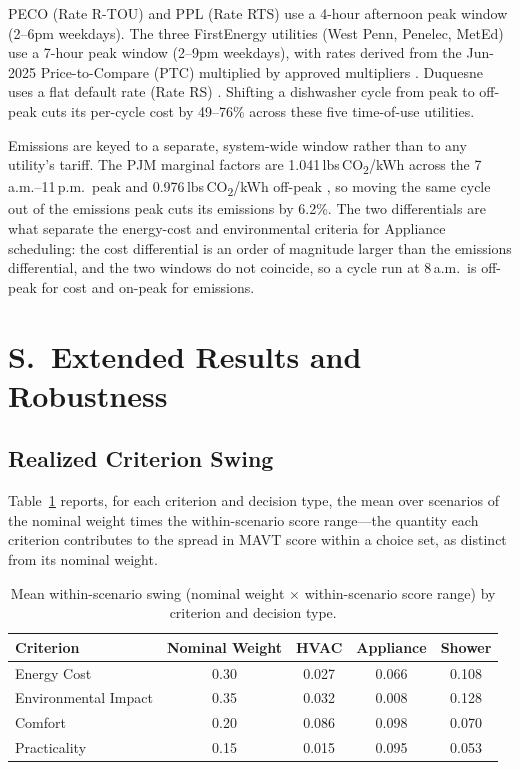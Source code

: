 \documentclass[11pt]{article}
\newcounter{suppsectioncounter}
\newcommand{\suppsection}[1]{%
  \stepcounter{suppsectioncounter}%
  \section*{S\thesuppsectioncounter.\ #1}%
  \setcounter{table}{0}\setcounter{figure}{0}\setcounter{equation}{0}%
  \renewcommand{\theHtable}{S\thesuppsectioncounter.\arabic{table}}%
  \renewcommand{\theHfigure}{S\thesuppsectioncounter.\arabic{figure}}%
}
\begin{document}
PECO (Rate R-TOU) \citep{peco2021} and PPL (Rate RTS) \citep{ppl2025} use a 4-hour afternoon peak window (2--6pm weekdays). The three FirstEnergy utilities (West Penn, Penelec, MetEd) use a 7-hour peak window (2--9pm weekdays), with rates derived from the Jun-2025 Price-to-Compare (PTC) multiplied by approved multipliers \citep{firstenergy2025,firstenergy2026}. Duquesne uses a flat default rate (Rate RS) \citep{duquesne2026}. Shifting a dishwasher cycle from peak to off-peak cuts its per-cycle cost by 49--76\% across these five time-of-use utilities.

Emissions are keyed to a separate, system-wide window rather than to any utility's tariff. The PJM marginal factors are 1.041\,lbs\,CO\textsubscript{2}/kWh across the 7\,a.m.--11\,p.m.\ peak and 0.976\,lbs\,CO\textsubscript{2}/kWh off-peak \citep{pjm2022emissions}, so moving the same cycle out of the emissions peak cuts its emissions by 6.2\%. The two differentials are what separate the energy-cost and environmental criteria for Appliance scheduling: the cost differential is an order of magnitude larger than the emissions differential, and the two windows do not coincide, so a cycle run at 8\,a.m.\ is off-peak for cost and on-peak for emissions.
\suppsection{Extended Results and Robustness}

\subsection{Realized Criterion Swing}
\label{app:swing_weights}

Table~\ref{tab:swing_weights} reports, for each criterion and decision type, the mean over scenarios of the nominal weight times the within-scenario score range---the quantity each criterion contributes to the spread in MAVT score within a choice set, as distinct from its nominal weight.

\begin{table}[htbp]
\centering
\footnotesize
\centering
\caption{Mean within-scenario swing (nominal weight $\times$ within-scenario score range) by criterion and decision type.}
\label{tab:swing_weights}
\renewcommand{\arraystretch}{1.15}
\begin{tabular}{lcccc}
\toprule
Criterion & Nominal Weight & HVAC & Appliance & Shower \\
\midrule
Energy Cost & 0.30 & 0.027 & 0.066 & 0.108 \\
Environmental Impact & 0.35 & 0.032 & 0.008 & 0.128 \\
Comfort & 0.20 & 0.086 & 0.098 & 0.070 \\
Practicality & 0.15 & 0.015 & 0.095 & 0.053 \\
\bottomrule
\end{tabular}
\renewcommand{\arraystretch}{1.0}
\end{table}
\end{document}
